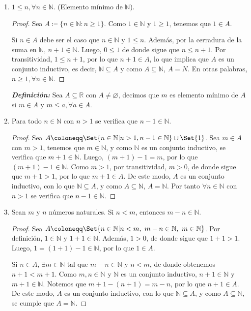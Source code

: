 \documentclass[11pt]{article}
\newcommand{\N}{\mathbb{N}}
\newcommand{\R}{\mathbb{R}}
\newcommand{\bfit}[1]{\textbf{\textit{#1}}}
\let\emptyset\varnothing
\let\set\Set
\let\union\cup
\begin{document}
\begin{enumerate}[label=\alph*)]
    \item $1\leq n, \forall n\in \N$. (Elemento mínimo de $\N$).
    \vspace{-1em}\begin{proof} 
        Sea $A\coloneqq \{n\in \N: n\geq 1\}$. Como $1\in \N$ y $1\geq 1$, tenemos que $1\in A$.

        Si $n\in A$ debe ser el caso que $n\in \N$ y $1\leq n$. Además, por la cerradura de la suma en $\N$, $n+1\in \N$. Luego, $0 \leq 1$ de donde sigue que $n \leq n+1$. Por transitividad, $1\leq n+1$, por lo que $n+1\in A$, lo que implica que $A$ es un conjunto inductivo, es decir, $\N\subseteq A$ y como $A\subseteq \N$, $A=N$. En otras palabras, $n\geq 1, \forall n\in\N$.
    \end{proof} \vspace{-1em}

    \bfit{Definición:}  Sea $A\subseteq \R$ con $A \neq \emptyset$, decimos que $m$ es elemento mínimo de $A$ si $m\in A$ y $m\leq a, \forall a\in A$.

    \item Para todo $n\in \N$ con $n>1$ se verifica que $n-1\in \N$.
    \vspace{-1em}\begin{proof} 
        Sea $A \coloneqq \set{n\in \N | n>1, n-1\in \N}\union \set{1}$. Sea $m\in A$ con $m>1$, tenemos que $m\in \N$, y como $\N$ es un conjunto inductivo, se verifica que $m+1\in\N$. Luego, $(m+1)-1=m$, por lo que $(m+1)-1\in \N$. Como $m>1$, por transitividad, $m>0$, de donde sigue que $m+1>1$, por lo que $m+1\in A$. De este modo, $A$ es un conjunto inductivo, con lo que $\N \subseteq A$, y como $A\subseteq \N$, $A=\N$. Por tanto $\forall n\in \N$ con $n>1$ se verifica que $n-1\in \N$.
    \end{proof} \vspace{-1em}

    \item Sean $m$ y $n$ números naturales. Si $n<m$, entonces $m-n\in\N$.
    \vspace{-1em}\begin{proof} 
        Sea $A \coloneqq \set{n\in \N| n<m, \ m-n\in\N, \ m\in \N}$. Por definición, $1\in \N$ y $1+1\in \N$. Además, $1>0$, de donde sigue que $1+1>1$. Luego, $1=(1+1)-1\in \N$, por lo que $1\in A$. 

        Si $n \in A$, $\exists m\in \N$ tal que $m-n\in \N$ y $n<m$, de donde obtenemos $n+1<m+1$. Como $m,n\in \N$ y $\N$ es un conjunto inductivo, $n+1\in \N$ y $m+1 \in \N$. Notemos que $m+1-(n+1)=m-n$, por lo que $n+1\in A$. De este modo, $A$ es un conjunto inductivo, con lo que $\N \subseteq A$, y como $A\subseteq \N$, se cumple que $A=\N$.
    \end{proof} \vspace{-1em}


\end{enumerate}
\end{document}
